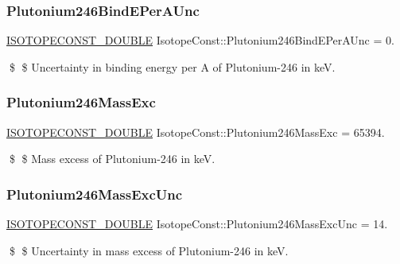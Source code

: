 \subsubsection{\texorpdfstring{Plutonium246\+Bind\+E\+Per\+A\+Unc}{Plutonium246BindEPerAUnc}}
{\footnotesize\ttfamily \mbox{\hyperlink{group___isotope_const-_macros_ga8f45a7272ce02c0b4c65c44636ed719a}{I\+S\+O\+T\+O\+P\+E\+C\+O\+N\+S\+T\+\_\+\+D\+O\+U\+B\+LE}} Isotope\+Const\+::\+Plutonium246\+Bind\+E\+Per\+A\+Unc = 0.}

\$ \$ Uncertainty in binding energy per A of Plutonium-\/246 in keV. \mbox{\label{group___isotope_const-_plutonium-_pu246_gab78550812cd6619378778340a3cc22ae}} 
\subsubsection{\texorpdfstring{Plutonium246\+Mass\+Exc}{Plutonium246MassExc}}
{\footnotesize\ttfamily \mbox{\hyperlink{group___isotope_const-_macros_ga8f45a7272ce02c0b4c65c44636ed719a}{I\+S\+O\+T\+O\+P\+E\+C\+O\+N\+S\+T\+\_\+\+D\+O\+U\+B\+LE}} Isotope\+Const\+::\+Plutonium246\+Mass\+Exc = 65394.}

\$ \$ Mass excess of Plutonium-\/246 in keV. \mbox{\label{group___isotope_const-_plutonium-_pu246_ga30db4a7e976269e6f8203a0127330727}} 
\subsubsection{\texorpdfstring{Plutonium246\+Mass\+Exc\+Unc}{Plutonium246MassExcUnc}}
{\footnotesize\ttfamily \mbox{\hyperlink{group___isotope_const-_macros_ga8f45a7272ce02c0b4c65c44636ed719a}{I\+S\+O\+T\+O\+P\+E\+C\+O\+N\+S\+T\+\_\+\+D\+O\+U\+B\+LE}} Isotope\+Const\+::\+Plutonium246\+Mass\+Exc\+Unc = 14.}

\$ \$ Uncertainty in mass excess of Plutonium-\/246 in keV. \mbox{\label{group___isotope_const-_plutonium-_pu246_gabd83498f3c3540ad0129530b3e499549}} 
